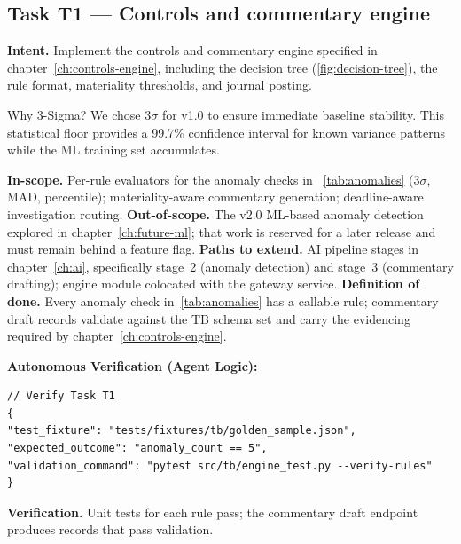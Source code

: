 \documentclass[11pt,a4paper,twoside]{report}
\begin{document}
\subsection*{Task T1 --- Controls and commentary engine}
\textbf{Intent.} Implement the controls and commentary engine
specified in chapter~\ref{ch:controls-engine}, including the decision
tree (\ref{fig:decision-tree}), the rule format, materiality
thresholds, and journal posting.

\begin{adrbox}{Why 3-Sigma?}
We chose $3\sigma$ for v1.0 to ensure immediate baseline stability. This statistical floor provides a 99.7\% confidence interval for known variance patterns while the ML training set accumulates.
\end{adrbox}

\textbf{In-scope.} Per-rule evaluators for the anomaly checks in
~\ref{tab:anomalies} (3$\sigma$, MAD, percentile); materiality-aware
commentary generation; deadline-aware investigation routing.
\textbf{Out-of-scope.} The v2.0 ML-based anomaly detection explored
in chapter~\ref{ch:future-ml}; that work is reserved for a later
release and must remain behind a feature flag.
\textbf{Paths to extend.} AI pipeline stages in
chapter~\ref{ch:ai}, specifically stage~2 (anomaly detection) and
stage~3 (commentary drafting); engine module colocated with the
gateway service.
\textbf{Definition of done.} Every anomaly check
in~\ref{tab:anomalies} has a callable rule; commentary draft records
validate against the TB schema set and carry the evidencing required
by chapter~\ref{ch:controls-engine}.

\textbf{Autonomous Verification (Agent Logic):}
\begin{lstlisting}[language=jsonx]
// Verify Task T1
{
"test_fixture": "tests/fixtures/tb/golden_sample.json",
"expected_outcome": "anomaly_count == 5",
"validation_command": "pytest src/tb/engine_test.py --verify-rules"
}
\end{lstlisting}

\textbf{Verification.} Unit tests for each rule pass; the commentary
draft endpoint produces records that pass validation.
\end{document}

